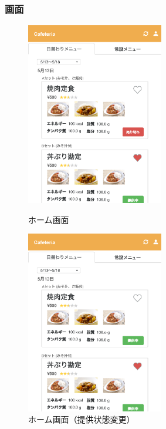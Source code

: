 \documentclass[a4paper]{ltjsarticle}
\begin{document}
    \subsubsection{画面}
    \begin{figure}[ht]
        \begin{minipage}[t]{.49\textwidth}
            \center
            \includegraphics[width=60mm]{ui/home.png}
            \caption{ホーム画面}
            \label{img:home}
        \end{minipage}
        \begin{minipage}[t]{.49\textwidth}
            \center
            \includegraphics[width=60mm]{ui/home-change-status.png}
            \caption{ホーム画面（提供状態変更）}
            \label{img:home-change-status}
        \end{minipage}
    \end{figure}
\end{document}
